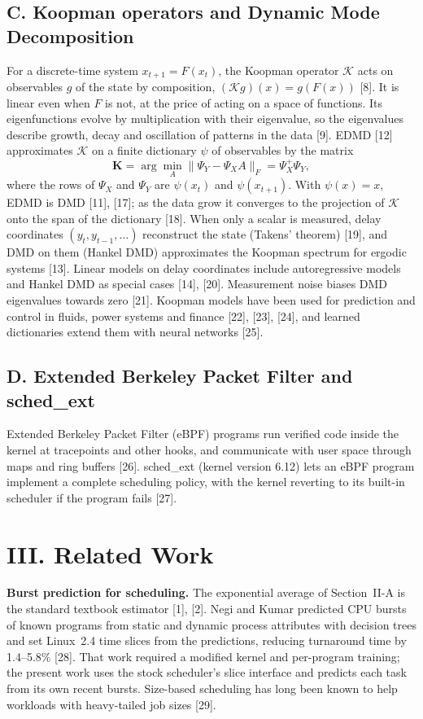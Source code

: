\documentclass{article}
\newcommand{\K}{\mathbf{K}}
\begin{document}
\subsection*{C. Koopman operators and Dynamic Mode Decomposition}
For a discrete-time system $x_{t+1}=F(x_t)$, the Koopman operator $\mathcal{K}$ acts on observables $g$ of the state by composition, $(\mathcal{K}g)(x)=g(F(x))$ [8]. It is linear even when $F$ is not, at the price of acting on a space of functions. Its eigenfunctions evolve by multiplication with their eigenvalue, so the eigenvalues describe growth, decay and oscillation of patterns in the data [9]. EDMD [12] approximates $\mathcal{K}$ on a finite dictionary $\psi$ of observables by the matrix
\begin{equation}
\K=\arg\min_A\|\Psi_Y-\Psi_XA\|_F=\Psi_X^{+}\Psi_Y ,
\end{equation}
where the rows of $\Psi_X$ and $\Psi_Y$ are $\psi(x_t)$ and $\psi(x_{t+1})$. With $\psi(x)=x$, EDMD is DMD [11], [17]; as the data grow it converges to the projection of $\mathcal{K}$ onto the span of the dictionary [18]. When only a scalar is measured, delay coordinates $(y_t,y_{t-1},\dots)$ reconstruct the state (Takens' theorem) [19], and DMD on them (Hankel DMD) approximates the Koopman spectrum for ergodic systems [13]. Linear models on delay coordinates include autoregressive models and Hankel DMD as special cases [14], [20]. Measurement noise biases DMD eigenvalues towards zero [21]. Koopman models have been used for prediction and control in fluids, power systems and finance [22], [23], [24], and learned dictionaries extend them with neural networks [25].

\subsection*{D. Extended Berkeley Packet Filter and sched\_ext}
Extended Berkeley Packet Filter (eBPF) programs run verified code inside the kernel at tracepoints and other hooks, and communicate with user space through maps and ring buffers [26]. sched\_ext (kernel version 6.12) lets an eBPF program implement a complete scheduling policy, with the kernel reverting to its built-in scheduler if the program fails [27].

\section*{III. Related Work}
\textbf{Burst prediction for scheduling.} The exponential average of Section~II-A is the standard textbook estimator [1], [2]. Negi and Kumar predicted CPU bursts of known programs from static and dynamic process attributes with decision trees and set Linux~2.4 time slices from the predictions, reducing turnaround time by 1.4--5.8\% [28]. That work required a modified kernel and per-program training; the present work uses the stock scheduler's slice interface and predicts each task from its own recent bursts. Size-based scheduling has long been known to help workloads with heavy-tailed job sizes [29].
\end{document}
